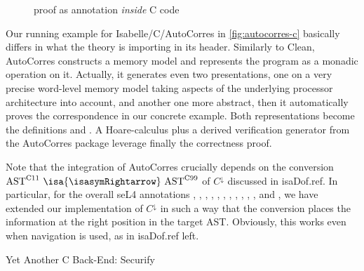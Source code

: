 \begin{isabellebody}
\begin{isamarkuptext}
\begin{figure}
{           proof as annotation \emph{inside} C code}
  \label{fig:autocorres-c}
\end{figure}
Our running example  for Isabelle/C/AutoCorres in \autoref{fig:autocorres-c} basically differs in what
the theory is importing in its header. Similarly to Clean, AutoCorres constructs a memory model and
represents the program as a monadic operation on it. Actually, it generates even two presentations,
one on a very precise word-level memory model taking aspects of the underlying processor
architecture into account, and another one more abstract, then it automatically proves the
correspondence in our concrete example. Both representations become the definitions
 and . A Hoare-calculus plus
a derived verification generator  from the AutoCorres package
leverage finally the correctness proof.%
\end{isamarkuptext}\isamarkuptrue%
%
\begin{isamarkuptext}%
Note that the integration of AutoCorres crucially depends on the conversion
$\text{AST}^\text{C11}~\isa{{\isasymRightarrow}}~\text{AST}^\text{C99}$ of $C^\downarrow$
discussed in \csname isaDof.ref. In particular, for the overall seL4
annotations
,
,
,
,
,
,
,
,
,
,
, and
,
we have extended our implementation of $C^\downarrow$ in such a way that the conversion places the
information at the right position in the target AST. Obviously, this works even when navigation is
used, as in \csname isaDof.ref left.%
\end{isamarkuptext}\isamarkuptrue%
%
\begin{isamarkupsubsection*}%
[label = {securify},type = {scholarly_paper.technical}, args={label = {securify},type = {scholarly_paper.technical}, Isa_COL.text_element.level = {}, Isa_COL.text_element.referentiable = {False}, Isa_COL.text_element.variants = {{STR ''outline'', STR ''document''}}, scholarly_paper.text_section.main_author = {}, scholarly_paper.text_section.fixme_list = {}, Isa_COL.text_element.level = {}, scholarly_paper.technical.definition_list = {}}]Yet Another C Back-End: Securify%

\end{isamarkupsubsection*}
\end{isabellebody}

